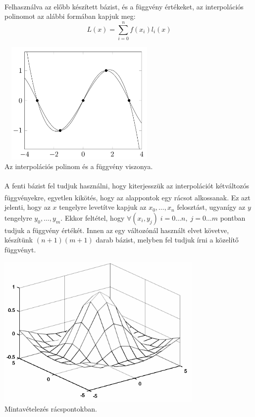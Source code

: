 \documentclass[12pt]{report}
\begin{document}
\paragraph{}
Felhasználva az előbb készített bázist, és a függvény értékeket, az interpolációs polinomot az alábbi formában kapjuk meg:
$$
L(x) = \sum_{i=0}^{n} f(x_i) l_i(x)
$$
\begin{center}
\includegraphics[width=8cm,height=6cm]{pics/polynomial_interpolation}\\
{\footnotesize Az interpolációs polinom és a függvény viszonya.}
\end{center}
\paragraph{}
A fenti bázist fel tudjuk használni, hogy kiterjesszük az interpolációt kétváltozós függvényekre\textsuperscript{\cite{numerical-mathematics}}, egyetlen kikötés, hogy az alappontok egy rácsot alkossanak. Ez azt jelenti, hogy az $x$ tengelyre levetítve kapjuk az $x_0, \dots, x_n$ felosztást, ugyanígy az $y$ tengelyre $y_0, \dots, y_m$. Ekkor feltétel, hogy $\forall (x_i, y_j) \; i = 0 \dots n, \; j = 0 \dots m$ pontban tudjuk a függvény értékét. Innen az egy változónál használt elvet követve, készítünk $(n+1)(m+1)$ darab bázist, melyben fel tudjuk írni a közelítő függvényt.
\begin{center}
\includegraphics[width=10cm]{pics/bivariable_grid}\\
{\footnotesize Mintavételezés rácspontokban.}
\end{center}
\end{document}
